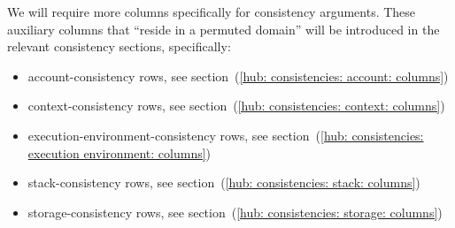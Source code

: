 We will require more columns specifically for consistency arguments.
These auxiliary columns that ``reside in a permuted domain'' will be introduced in the relevant consistency sections, specifically:
\begin{itemize}
	\item account-consistency rows,               see section~(\ref{hub: consistencies: account: columns})
	\item context-consistency rows,               see section~(\ref{hub: consistencies: context: columns})
	\item execution-environment-consistency rows, see section~(\ref{hub: consistencies: execution environment: columns})
	\item stack-consistency rows,                 see section~(\ref{hub: consistencies: stack: columns})
	\item storage-consistency rows,               see section~(\ref{hub: consistencies: storage: columns})
\end{itemize}
